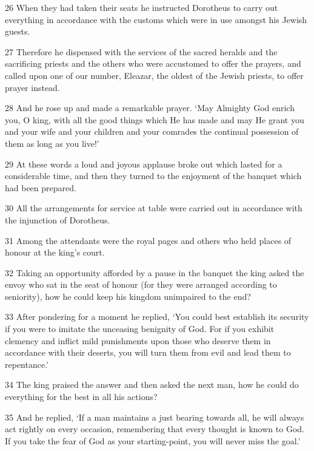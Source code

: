\par 26 When they had taken their seats he instructed Dorotheus to carry out everything in accordance with the customs which were in use amongst his Jewish guests.

\par 27 Therefore he dispensed with the services of the sacred heralds and the sacrificing priests and the others who were accustomed to offer the prayers, and called upon one of our number, Eleazar, the oldest of the Jewish priests, to offer prayer instead.

\par 28 And he rose up and made a remarkable prayer. ‘May Almighty God enrich you, O king, with all the good things which He has made and may He grant you and your wife and your children and your comrades the continual possession of them as long as you live!’

\par 29 At these words a loud and joyous applause broke out which lasted for a considerable time, and then they turned to the enjoyment of the banquet which had been prepared.

\par 30 All the arrangements for service at table were carried out in accordance with the injunction of Dorotheus.

\par 31 Among the attendants were the royal pages and others who held places of honour at the king's court.

\par 32 Taking an opportunity afforded by a pause in the banquet the king asked the envoy who sat in the seat of honour (for they were arranged according to seniority), how he could keep his kingdom unimpaired to the end?

\par 33 After pondering for a moment he replied, ‘You could best establish its security if you were to imitate the unceasing benignity of God. For if you exhibit clemency and inflict mild punishments upon those who deserve them in accordance with their deserts, you will turn them from evil and lead them to repentance.’

\par 34 The king praised the answer and then asked the next man, how he could do everything for the best in all his actions?

\par 35 And he replied, ‘If a man maintains a just bearing towards all, he will always act rightly on every occasion, remembering that every thought is known to God. If you take the fear of God as your starting-point, you will never miss the goal.’

